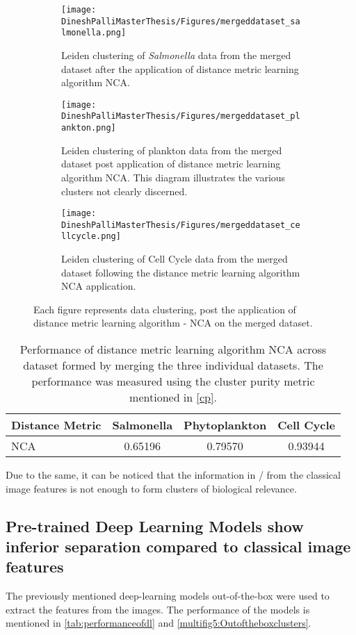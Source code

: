 \documentclass[12pt,a4paper]{article}
\begin{document}
\begin{figure}
  \centering
  \begin{subfigure}{\linewidth}
    \texttt{[image: DineshPalliMasterThesis/Figures/mergeddataset\_salmonella.png]}
    \caption{Leiden clustering of \textit{Salmonella} data from the merged dataset after the application of distance metric learning algorithm NCA.}
    \label{multifig5:image_a}
  \end{subfigure}
  \hfill
  \begin{subfigure}{\linewidth}
    \texttt{[image: DineshPalliMasterThesis/Figures/mergeddataset\_plankton.png]}
    \caption{Leiden clustering of plankton data from the merged dataset post application of distance metric learning algorithm NCA. This diagram illustrates the various clusters not clearly discerned.}
    \label{multifig5:image_b}
  \end{subfigure}
  \hfill
  \begin{subfigure}{\linewidth}
    \texttt{[image: DineshPalliMasterThesis/Figures/mergeddataset\_cellcycle.png]}
    \caption{Leiden clustering of Cell Cycle data from the merged dataset following the distance metric learning algorithm NCA application.}
    \label{multifig5:image_c}
  \end{subfigure}
  \caption{Each figure represents data clustering, post the application of distance metric learning algorithm - NCA on the merged dataset.}
  \label{multifig5:mergeddataset_clusters}
\end{figure}


\begin{table}[h]
\small
\centering
\caption{Performance of distance metric learning algorithm NCA across dataset formed by merging the three individual datasets. The performance was measured using the cluster purity metric mentioned in \ref{cp}.}
\label{tab:DMLonmergeddataset}
\begin{tabular}{lccc}
\hline
\textbf{Distance Metric} & \textbf{Salmonella} & \textbf{Phytoplankton} & \textbf{Cell Cycle} \\
\hline
NCA & 0.65196 & 0.79570 & 0.93944 \\
\hline
\end{tabular}
\end{table}


Due to the same, it can be noticed that the information in / from the classical image features is not enough to form clusters of biological relevance.

\subsection{Pre-trained Deep Learning Models show inferior separation compared to classical image features}
The previously mentioned deep-learning models out-of-the-box were used to extract the features from the images. The performance of the models is mentioned in \ref{tab:performanceofdl} and \ref{multifig5:Outoftheboxclusters}.
\end{document}
